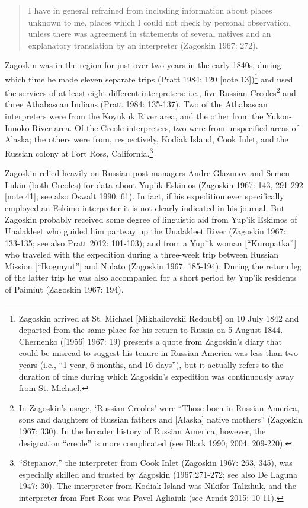 \begin{quote}
    I have in general refrained from including information about places unknown to me, places which I could not check by personal observation, unless there was agreement in statements of several natives and an explanatory translation by an interpreter (Zagoskin 1967: 272).
\end{quote}

Zagoskin was in the region for just over two years in the early 1840s, during which time he made eleven separate trips (Pratt 1984: 120 [note 13])\footnote{Zagoskin arrived at St. Michael [Mikhailovskii Redoubt] on 10 July 1842 and departed from the same place for his return to Russia on 5 August 1844.  Chernenko ([1956] 1967: 19) presents a quote from Zagoskin’s diary that could be misread to suggest his tenure in Russian America was less than two years (i.e., “1 year, 6 months, and 16 days”), but it actually refers to the duration of time during which Zagoskin’s expedition was continuously away from St. Michael.} and used the services of at least eight different interpreters: i.e., five Russian Creoles\footnote{In Zagoskin’s usage, ‘Russian Creoles’ were “Those born in Russian America, sons and daughters of Russian fathers and [Alaska] native mothers” (Zagoskin 1967: 330). In the broader history of Russian America, however, the designation “creole” is more complicated (see Black 1990; 2004: 209-220). } and three Athabascan Indians (Pratt 1984: 135-137).  Two of the Athabascan interpreters were from the Koyukuk River area, and the other from the Yukon-Innoko River area. Of the Creole interpreters, two were from unspecified areas of Alaska; the others were from, respectively, Kodiak Island, Cook Inlet, and the Russian colony at Fort Ross, California.\footnote{“Stepanov,” the interpreter from Cook Inlet (Zagoskin 1967: 263, 345), was especially skilled and trusted by Zagoskin (1967:271-272; see also De Laguna 1947: 30). The interpreter from Kodiak Island was Nikifor Talizhuk, and the interpreter from Fort Ross was Pavel Agliaiuk (see Arndt 2015: 10-11). }

Zagoskin relied heavily on Russian post managers Andre Glazunov and Semen Lukin (both Creoles) for data about Yup’ik Eskimos (Zagoskin 1967: 143, 291-292 [note 41]; see also Oswalt 1990: 61). In fact, if his expedition ever specifically employed an Eskimo interpreter it is not clearly indicated in his journal.  But Zagoskin probably received some degree of linguistic aid from Yup’ik Eskimos of Unalakleet who guided him partway up the Unalakleet River (Zagoskin 1967: 133-135; see also Pratt 2012: 101-103); and from a Yup’ik woman [“Kuropatka”] who traveled with the expedition during a three-week trip between Russian Mission [“Ikogmyut”] and Nulato (Zagoskin 1967: 185-194). During the return leg of the latter trip he was also accompanied for a short period by Yup’ik residents of Paimiut (Zagoskin 1967: 194).

